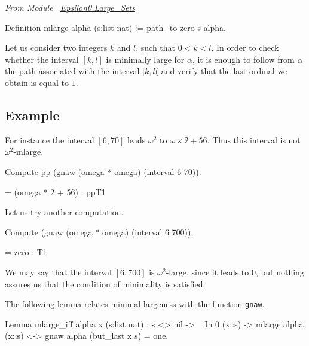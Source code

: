 \vspace{4pt}

\noindent
\emph{From Module~ \href{../theories/html/hydras.Epsilon0.Large_Sets.html\#mlarge}{Epsilon0.Large\_Sets}}


\begin{Coqsrc}
Definition mlarge alpha (s:list nat) := path_to zero s alpha.
\end{Coqsrc}






Let us consider two integers $k$ and $l$, such that $0<k<l$. In order to check whether the interval $[k,l]$ is minimally large for $\alpha$, it is enough to
follow from $\alpha$ the path associated with the interval $[k,l($ and verify that the last ordinal we obtain is equal to $1$.
 
\subsection{Example}

For instance the interval $[6,70]$ leads $\omega^2$ to $\omega\times 2 + 56$. Thus this interval is not $\omega^2$-mlarge.


\begin{Coqsrc}
Compute pp (gnaw (omega * omega) (interval 6 70)).
\end{Coqsrc}

\begin{Coqanswer}
 = (omega * 2 + 56)%
     : ppT1
\end{Coqanswer}

Let us try another computation.

\begin{Coqsrc}
Compute (gnaw (omega * omega) (interval 6 700)).
\end{Coqsrc}

\begin{Coqanswer}
 = zero : T1
\end{Coqanswer}

We may say that the interval $[6,700]$ is $\omega^2$-large, since it leads to $0$, but nothing assures us that the condition of minimality is satisfied.

The following lemma relates minimal largeness with the function 
\texttt{gnaw}. 

\begin{Coqsrc}
Lemma mlarge_iff alpha x (s:list nat) :
  s <> nil -> ~ In 0 (x::s) ->
  mlarge alpha (x::s) <-> gnaw alpha (but_last x s) = one.
 \end{Coqsrc}


